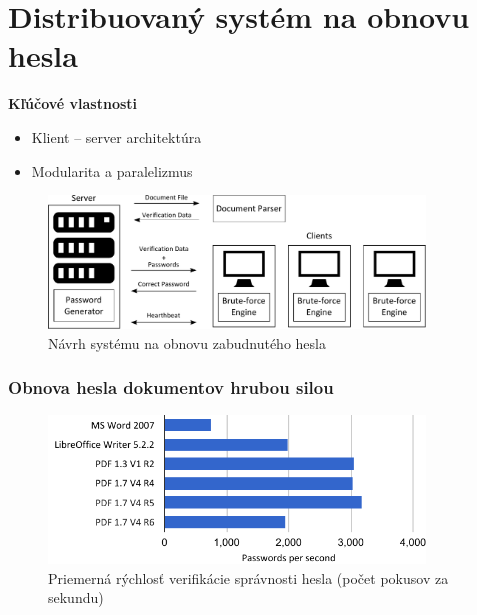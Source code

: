 \documentclass[xcolor=dvipsnames]{beamer}
\def\itemtitle#1{{\bfseries#1\smallskip}}
\begin{document}
\section{Distribuovaný systém na obnovu hesla}
\begin{frame}
	\itemtitle{Kľúčové vlastnosti}
	\begin{itemize}
		\item Klient -- server architektúra
		\item Modularita a paralelizmus
	\end{itemize}
	\bigskip
	\begin{figure}[h]
		\centering
		\includegraphics[width=100mm]{images/ddpbf_design.pdf} \\	
		\bigskip
		\scriptsize{Návrh systému na obnovu zabudnutého hesla}	
	\end{figure}
\end{frame}


\begin{frame}
	\frametitle{Obnova hesla dokumentov hrubou silou}
	
	\begin{figure}[h]
		\centering
		\includegraphics[width=100mm]{images/average_speed.pdf} \\	
		\bigskip
		\scriptsize{Priemerná rýchlosť verifikácie správnosti hesla (počet pokusov za sekundu)}	
	\end{figure}
\end{frame}

\end{document}
